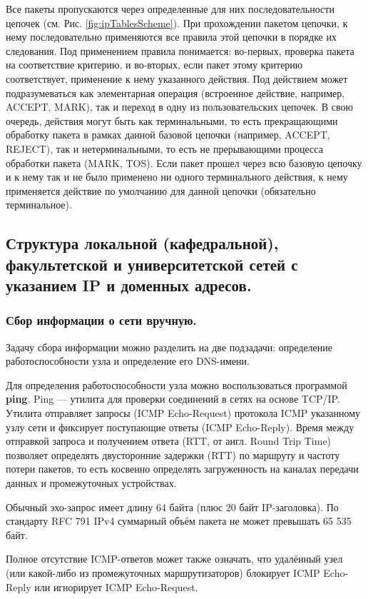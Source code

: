 \documentclass[a4paper]{article}
\begin{document}
	Все пакеты пропускаются через определенные для них последовательности цепочек (см. Рис. \ref{fig:ipTablesScheme}). При прохождении пакетом цепочки, к нему последовательно применяются все правила этой цепочки в порядке их следования. Под применением правила понимается: во-первых, проверка пакета на соответствие критерию, и во-вторых, если пакет этому критерию соответствует, применение к нему указанного действия. Под действием может подразумеваться как элементарная операция (встроенное действие, например, ACCEPT, MARK), так и переход в одну из пользовательских цепочек. В свою очередь, действия могут быть как терминальными, то есть прекращающими обработку пакета в рамках данной базовой цепочки (например, ACCEPT, REJECT), так и нетерминальными, то есть не прерывающими процесса обработки пакета (MARK, TOS). Если пакет прошел через всю базовую цепочку и к нему так и не было применено ни одного терминального действия, к нему применяется действие по умолчанию для данной цепочки (обязательно терминальное).
	
	\subsection{Структура локальной (кафедральной), факультетской и университетской сетей с указанием IP и доменных адресов.}
	
		\subsubsection{Сбор информации о сети вручную.}
		
			Задачу сбора информации можно разделить на две подзадачи: определение работоспособности узла и определение его DNS-имени.
			
			Для определения работоспособности узла можно воспользоваться программой \textbf{ping}. Ping — утилита для проверки соединений в сетях на основе TCP/IP. Утилита отправляет запросы (ICMP Echo-Request) протокола ICMP указанному узлу сети и фиксирует поступающие ответы (ICMP Echo-Reply). Время между отправкой запроса и получением ответа (RTT, от англ. Round Trip Time) позволяет определять двусторонние задержки (RTT) по маршруту и частоту потери пакетов, то есть косвенно определять загруженность на каналах передачи данных и промежуточных устройствах.
			
			Обычный эхо-запрос имеет длину 64 байта (плюс 20 байт IP-заголовка). По стандарту RFC 791 IPv4 суммарный объём пакета не может превышать 65 535 байт.
			
			Полное отсутствие ICMP-ответов может также означать, что удалённый узел (или какой-либо из промежуточных маршрутизаторов) блокирует ICMP Echo-Reply или игнорирует ICMP Echo-Request.
			
\end{document}
